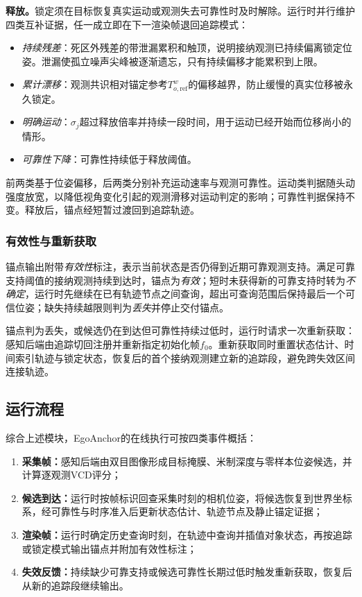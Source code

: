 \documentclass[review]{vgtc}
\begin{document}
\textbf{释放。}锁定须在目标恢复真实运动或观测失去可靠性时及时解除。运行时并行维护四类互补证据，任一成立即在下一渲染帧退回追踪模式：
\begin{itemize}[leftmargin=1.6em,itemsep=1pt,topsep=2pt]
  \item \emph{持续残差}：死区外残差的带泄漏累积和触顶，说明接纳观测已持续偏离锁定位姿。泄漏使孤立噪声尖峰被逐渐遗忘，只有持续偏移才能累积到上限。
  \item \emph{累计漂移}：观测共识相对锚定参考$T_{o,\mathrm{ref}}^w$的偏移越界，防止缓慢的真实位移被永久锁定。
  \item \emph{明确运动}：$\sigma_j$超过释放倍率并持续一段时间，用于运动已经开始而位移尚小的情形。
  \item \emph{可靠性下降}：可靠性持续低于释放阈值。
\end{itemize}
前两类基于位姿偏移，后两类分别补充运动速率与观测可靠性。运动类判据随头动强度放宽，以降低视角变化引起的观测滑移对运动判定的影响；可靠性判据保持不变。释放后，锚点经短暂过渡回到追踪轨迹。

\subsubsection{有效性与重新获取}\label{sec:validity}

锚点输出附带\emph{有效性}标注，表示当前状态是否仍得到近期可靠观测支持。满足可靠支持阈值的接纳观测持续到达时，锚点为\emph{有效}；短时未获得新的可靠支持时转为\emph{不确定}，运行时先继续在已有轨迹节点之间查询，超出可查询范围后保持最后一个可信位姿；缺失持续越限则判为\emph{丢失}并停止交付锚点。

锚点判为丢失，或候选仍在到达但可靠性持续过低时，运行时请求一次重新获取：感知后端由追踪切回注册并重新指定初始化帧$f_0$。重新获取同时重置状态估计、时间索引轨迹与锁定状态，恢复后的首个接纳观测建立新的追踪段，避免跨失效区间连接轨迹。

\subsection{运行流程}\label{sec:runtime-flow}

综合上述模块，EgoAnchor的在线执行可按四类事件概括：
\begin{enumerate}[leftmargin=1.8em,itemsep=1pt,topsep=2pt]
  \item \textbf{采集帧：}感知后端由双目图像形成目标掩膜、米制深度与零样本位姿候选，并计算逐观测VCD评分；
  \item \textbf{候选到达：}运行时按帧标识回查采集时刻的相机位姿，将候选恢复到世界坐标系，经可靠性与时序准入后更新状态估计、轨迹节点及静止锚定证据；
  \item \textbf{渲染帧：}运行时确定历史查询时刻，在轨迹中查询并插值对象状态，再按追踪或锁定模式输出锚点并附加有效性标注；
  \item \textbf{失效反馈：}持续缺少可靠支持或候选可靠性长期过低时触发重新获取，恢复后从新的追踪段继续输出。
\end{enumerate}
\end{document}
